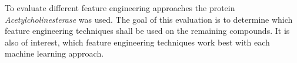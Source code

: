 To evaluate different feature engineering approaches the protein \textit{Acetylcholinesterase} was used.
The goal of this evaluation is to determine which feature engineering techniques shall be used on the 
remaining compounds. It is also of interest, which feature engineering techniques work best with each machine learning approach.
 